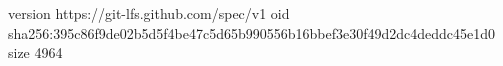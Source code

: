 version https://git-lfs.github.com/spec/v1
oid sha256:395c86f9de02b5d5f4be47c5d65b990556b16bbef3e30f49d2dc4deddc45e1d0
size 4964

